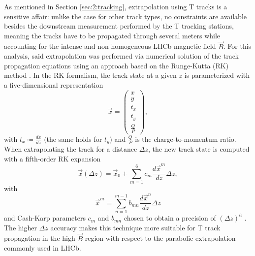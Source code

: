 As mentioned in Section \ref{sec:2:tracking}, extrapolation using T tracks is a sensitive affair:
unlike the case for other track types, no constraints are available besides the downstream measurement performed by the T tracking stations, meaning the tracks have to be propagated through several meters while accounting for the intense and non-homogeneous LHCb magnetic field $\vec{B}$.
For this analysis, said extrapolation was performed via numerical solution of the track propagation equations using an approach based on the Runge-Kutta (RK) method \cite{Hairer1993}.
In the RK formalism, the track state at a given $z$ is parameterized with a five-dimensional representation
\begin{equation}
\vec{x} = \begin{pmatrix}
	x \\ y \\ t_x \\ t_y \\ \frac{Q}{P}
\end{pmatrix},
\end{equation}
with $t_{x} \coloneqq \frac{dx}{dz}$ (the same holds for $t_y$) and $\frac{Q}{P}$ is the charge-to-momentum ratio.
When extrapolating the track for a distance $\Delta z$, the new track state is computed with a fifth-order RK expansion
\begin{equation}
\vec{x}(\Delta z) = \vec{x}_0 + \sum_{m=1}^6 c_m \frac{d\vec{x}^m}{dz} \Delta z,
\end{equation}
with
\begin{equation}
\vec{x}^m = \sum_{n=1}^{m-1} b_{mn} \frac{d\vec{x}^n}{dz} \Delta z
\end{equation}
and Cash-Karp parameters $c_m$ and $b_{mn}$ chosen to obtain a precision of $(\Delta z)^6$ \cite{Bos:1070314}.
The higher $\Delta z$ accuracy makes this technique more suitable for T track propagation in the high-$\vec{B}$ region with respect to the parabolic extrapolation commonly used in LHCb.



%
%

